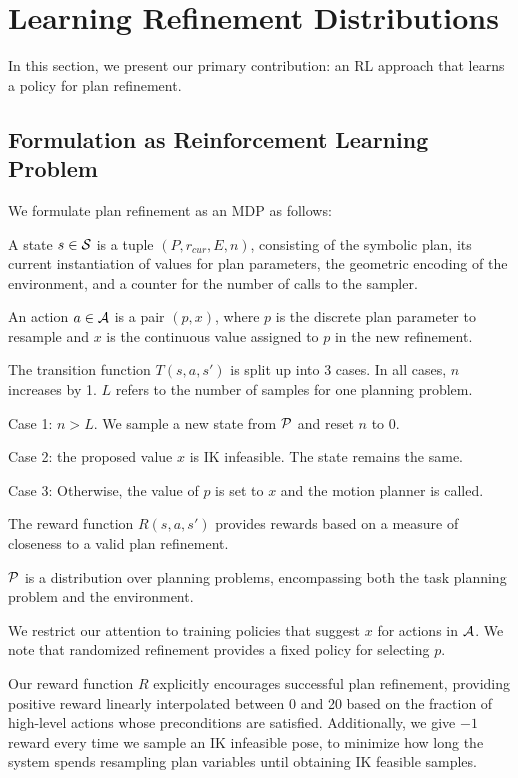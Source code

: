 \section{Learning Refinement Distributions}
In this section, we present our primary contribution: an RL
approach that learns a policy for plan refinement.

\subsection{Formulation as Reinforcement Learning Problem}
We formulate plan refinement as an MDP as follows:
\begin{tightlist}
\item A state $s \in \mathcal{S}$ is a tuple $(P, r_{cur}, E, n)$, consisting of the
symbolic plan, its current instantiation of values for plan parameters,
the geometric encoding of the environment, and a counter for
the number of calls to the sampler.
\item An action $a \in \mathcal{A}$ is a pair $(p, x)$, where $p$ is the discrete plan
parameter to resample and $x$ is the continuous value assigned to $p$ in the new refinement.
\item The transition function $T(s, a, s')$ is split up into 3 cases. In all cases, $n$ increases by 1. $L$ refers to
the number of samples for one planning problem.
  \begin{tightlist}
  \item Case 1: $n > L$. We sample a new state from $\mathcal{P}$ and reset $n$ to 0.
  \item Case 2: the proposed value $x$ is IK infeasible. The state remains the same.
  \item Case 3: Otherwise, the value of $p$ is set to $x$ and the motion planner is called.
  \end{tightlist}
\item The reward function $R(s, a, s')$ provides rewards based on a measure of closeness to a valid plan refinement.
\item $\mathcal{P}$ is a distribution over planning problems, encompassing both the task planning problem
and the environment.
\end{tightlist}

We restrict our attention to training policies that suggest $x$ for actions in $\mathcal{A}$.
We note that randomized refinement provides a fixed policy for selecting $p$.

Our reward function $R$ explicitly encourages successful plan refinement, providing positive reward linearly
interpolated between 0 and 20 based on the fraction of high-level actions whose preconditions are
satisfied. Additionally, we give $-1$ reward every time we sample an IK infeasible pose,
to minimize how long the system spends resampling plan variables until obtaining IK feasible samples.

